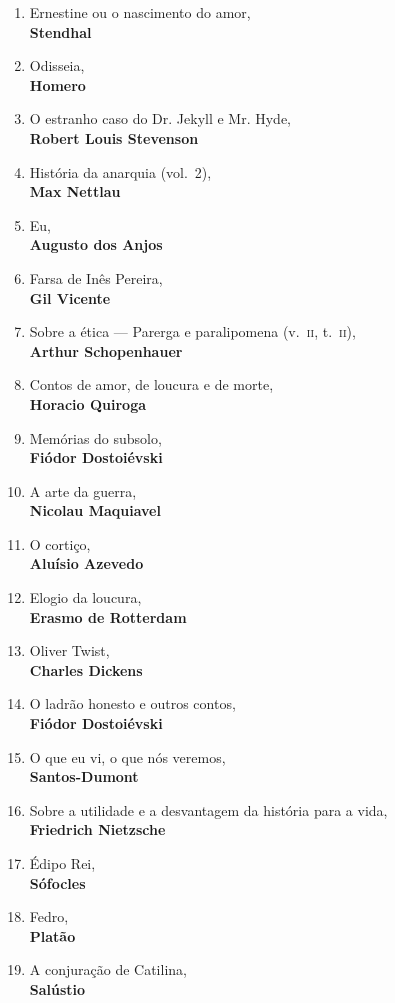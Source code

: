 \begin{enumerate} [font=\Formular\footnotesize]
\item Ernestine ou o nascimento do amor,\\ \textbf{Stendhal}
\item Odisseia,\\ \textbf{Homero}
\item O estranho caso do Dr. Jekyll e Mr. Hyde,\\ \textbf{Robert Louis Stevenson}
\item História da anarquia (vol.~2),\\ \textbf{Max Nettlau}
\item Eu,\\ \textbf{Augusto dos Anjos}
\item Farsa de Inês Pereira,\\ \textbf{Gil Vicente}
\item Sobre a ética --- Parerga e paralipomena (v.~\textsc{ii}, t.~\textsc{ii}),\\ \textbf{Arthur Schopenhauer} 
\item Contos de amor, de loucura e de morte,\\ \textbf{Horacio Quiroga}
\item Memórias do subsolo,\\ \textbf{Fiódor Dostoiévski}
\item A arte da guerra,\\ \textbf{Nicolau Maquiavel}
\item O cortiço,\\ \textbf{Aluísio Azevedo}
\item Elogio da loucura,\\ \textbf{Erasmo de Rotterdam}
\item Oliver Twist,\\ \textbf{Charles Dickens}
\item O ladrão honesto e outros contos,\\ \textbf{Fiódor Dostoiévski}
\item O que eu vi, o que nós veremos,\\ \textbf{Santos-Dumont}
\item Sobre a utilidade e a desvantagem da história para a vida,\\ \textbf{Friedrich Nietzsche}
\item Édipo Rei,\\ \textbf{Sófocles}
\item Fedro,\\ \textbf{Platão}
\item A conjuração de Catilina,\\ \textbf{Salústio}
\end{enumerate}

